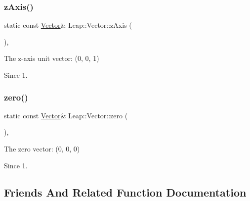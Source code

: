 \subsubsection{\texorpdfstring{z\+Axis()}{zAxis()}}
{\footnotesize\ttfamily static const \hyperlink{struct_leap_1_1_vector}{Vector}\& Leap\+::\+Vector\+::z\+Axis (\begin{DoxyParamCaption}{ }\end{DoxyParamCaption})\hspace{0.3cm}{\ttfamily [inline]}, {\ttfamily [static]}}

The z-\/axis unit vector\+: (0, 0, 1)


\begin{DoxyCodeInclude}
\end{DoxyCodeInclude}
 \begin{DoxySince}{Since}
1. 
\end{DoxySince}
\mbox{\label{struct_leap_1_1_vector_a743b469003fa6622a00ff277d2481da9}} 
\subsubsection{\texorpdfstring{zero()}{zero()}}
{\footnotesize\ttfamily static const \hyperlink{struct_leap_1_1_vector}{Vector}\& Leap\+::\+Vector\+::zero (\begin{DoxyParamCaption}{ }\end{DoxyParamCaption})\hspace{0.3cm}{\ttfamily [inline]}, {\ttfamily [static]}}

The zero vector\+: (0, 0, 0)


\begin{DoxyCodeInclude}
\end{DoxyCodeInclude}
 \begin{DoxySince}{Since}
1. 
\end{DoxySince}


\subsection{Friends And Related Function Documentation}
\mbox{\label{struct_leap_1_1_vector_a90f989718db5a1be59eb472f30e61472}} 
